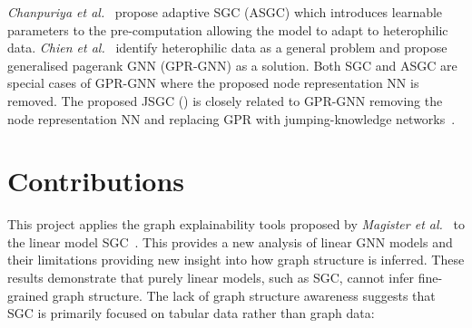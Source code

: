 \textit{Chanpuriya et al.}~\cite{chanpuriya2022simplified} propose adaptive SGC (ASGC) which introduces learnable parameters to the pre-computation allowing the model to adapt to heterophilic data.
\textit{Chien et al.}~\cite{chien2020adaptive} identify heterophilic data as a general problem and propose generalised pagerank GNN (GPR-GNN) as a solution.
Both SGC and ASGC are special cases of GPR-GNN where the proposed node representation NN is removed.
The proposed JSGC () is closely related to GPR-GNN removing the node representation NN and replacing GPR with jumping-knowledge networks~\cite{xu2018representation}.

%
%

\section{Contributions}

This project applies the graph explainability tools proposed by \textit{Magister et al.}~\cite{magister2021gcexplainer} to the linear model SGC~\cite{wu2019simplifying}.
This provides a new analysis of linear GNN models and their limitations providing new insight into how graph structure is inferred.
These results demonstrate that purely linear models, such as SGC, cannot infer fine-grained graph structure.
The lack of graph structure awareness suggests that SGC is primarily focused on tabular data rather than graph data:

